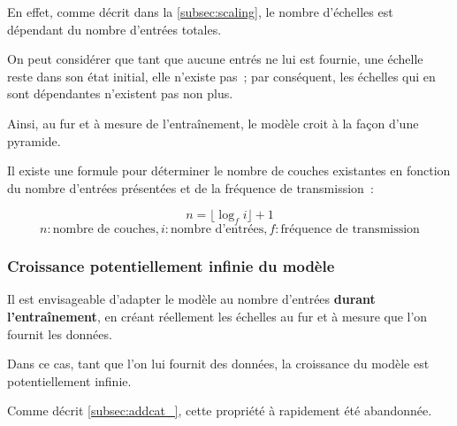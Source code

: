 {En effet, comme décrit dans la \autoref{subsec:scaling}, le nombre d'échelles est dépendant du nombre d'entrées totales. 

On peut considérer que tant que aucune entrés ne lui est fournie, une échelle reste dans son état initial, elle n'\og existe\fg{} pas~; par conséquent, les échelles qui en sont dépendantes n'\og existent\fg{} pas non plus.

Ainsi, au fur et à mesure de l'entraînement, le modèle croit à la façon d'une pyramide.

Il existe une formule pour déterminer le nombre de couches \og existantes\fg{} en fonction du nombre d'entrées présentées et de la fréquence de transmission~:

\[n = \lfloor\log_f i\rfloor + 1\]%
\[n: \text{nombre de couches}, i: \text{nombre d'entrées}, f: \text{fréquence de transmission}\]\label{growth_formula}

\subsubsection{Croissance potentiellement infinie du modèle}\label{inf_growth}
Il est envisageable d'adapter le modèle au nombre d'entrées \textbf{durant l'entraînement}, en créant réellement les échelles au fur et à mesure que l’on fournit les données.

Dans ce cas, tant que l'on lui fournit des données, la croissance du modèle est potentiellement infinie.

Comme décrit \autoref{subsec:addcat_}, cette propriété à rapidement été abandonnée.

%
%	
}